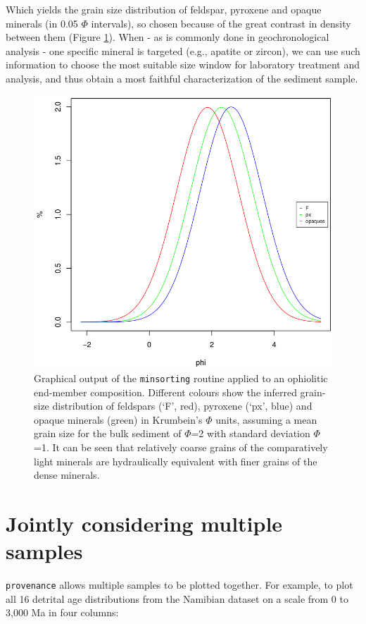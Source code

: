 \documentclass{article}
\begin{document}
Which yields the grain size distribution of feldspar, pyroxene and
opaque minerals (in 0.05 $\Phi$ intervals), so chosen because of the
great contrast in density between them (Figure \ref{fig:minsorting}).
When - as is commonly done in geochronological analysis - one specific
mineral is targeted (e.g., apatite or zircon), we can use such
information to choose the most suitable size window for laboratory
treatment and analysis, and thus obtain a most faithful
characterization of the sediment sample.

\begin{figure}
\centering
\includegraphics[width=.7\textwidth]{minsorting.png}
\caption{Graphical output of the {\tt minsorting} routine applied to
  an ophiolitic end-member composition. Different colours show the
  inferred grain-size distribution of feldspars (`F', red), pyroxene
  (`px', blue) and opaque minerals (green) in Krumbein's $\Phi$ units,
  assuming a mean grain size for the bulk sediment of $\Phi$=2 with
  standard deviation $\Phi$=1.  It can be seen that relatively coarse
  grains of the comparatively light minerals are hydraulically
  equivalent with finer grains of the dense minerals.}
\label{fig:minsorting}
\end{figure}

\section{Jointly considering multiple samples}
\label{sec:multiplesamples}

{\tt provenance} allows multiple samples to be plotted together. For
example, to plot all 16 detrital age distributions from the Namibian
dataset on a scale from 0 to 3,000 Ma in four columns:
\end{document}

